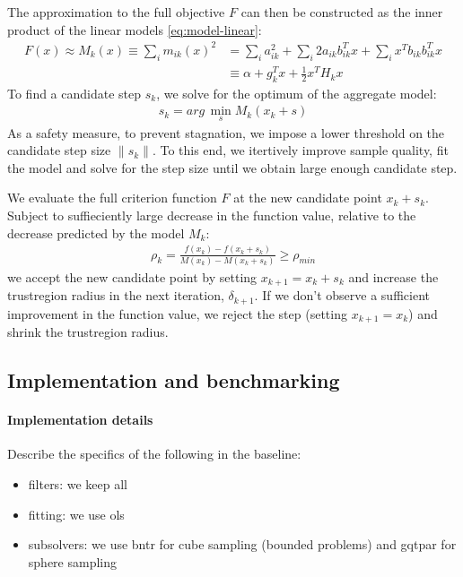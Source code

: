 \begin{itemize}
    The approximation to the full objective $F$ can then be constructed as the inner product of the linear models \ref{eq:model-linear}:
    \begin{align}
        F(x)\approx M_k(x)\equiv\sum\limits_im_{ik}(x)^2 &= \sum\limits_i a_{ik}^2 + \sum\limits_i 2a_{ik} b_{ik}^T x + \sum_i x^T b_{ik}b_{ik}^T x\nonumber\\
        &\equiv \alpha + g_k^T x + \frac{1}{2} x^T H_k x
        \label{eq:model-full}
    \end{align}
    To find a candidate step $s_k$, we solve for the optimum of the aggregate model:
    \begin{align}
        s_k = arg\,\min\limits_sM_k(x_k+s)
        \label{eq:cand-step}
    \end{align}
    As a safety measure, to prevent stagnation, we impose a lower threshold on the candidate step size $\lVert s_k\rVert$. To this end, we itertively improve sample quality, fit the model and solve for the step size until we obtain large enough candidate step.

    We evaluate the full criterion function $F$ at the new candidate point $x_k+s_k$. Subject to suffieciently large decrease in the function value, relative to the decrease predicted by the model $M_k$:
    \begin{align}
        \rho_k=\frac{f(x_k)-f(x_k+s_k)}{M(x_k)-M(x_k+s_k)}\geq\rho_{min}
        \label{eq:rho}
    \end{align}
    we accept the new candidate point by setting $x_{k+1}=x_k+s_k$ and increase the trustregion radius in the next iteration, $\delta_{k+1}$. If we don't observe a sufficient improvement in the function value, we reject the step (setting $x_{k+1}=x_k$) and shrink the trustregion radius.

\end{itemize}

\subsection{Implementation and benchmarking}

\paragraph{Implementation details} Describe the specifics of the following in the baseline:
\begin{itemize}
    \item filters: we keep all
    \item fitting: we use ols
    \item subsolvers: we use bntr for cube sampling (bounded problems) and gqtpar for sphere sampling
\end{itemize}
